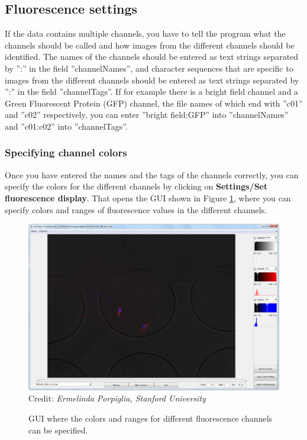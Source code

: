 \documentclass[a4paper, oneside, onecolumn, 11pt]{article}
\newcommand{\menu}[1]{\textbf{#1}}
\newcommand{\setting}[1]{''#1''}
\newcommand{\credit}[1]{\raggedleft \scriptsize Credit:\emph{ #1}}
\begin{document}
\subsection{Fluorescence settings}
\label{sec:settings-fluorescence}
If the data contains multiple channels, you have to tell the program what the channels should be called and how images from the different channels should be identified. The names of the channels should be entered as text strings separated by \setting{:} in the field \setting{channelNames}, and character sequences that are specific to images from the different channels should be entered as text strings separated by \setting{:} in the field \setting{channelTags}. If for example there is a bright field channel and a Green Fluorescent Protein (GFP) channel, the file names of which end with \setting{c01} and \setting{c02} respectively, you can enter \setting{bright field:GFP} into \setting{channelNames} and \setting{c01:c02} into \setting{channelTags}.

\subsubsection{Specifying channel colors}
Once you have entered the names and the tags of the channels correctly, you can specify the colors for the different channels by clicking on \menu{Settings/\allowbreak Set fluorescence display}. That opens the GUI shown in Figure \ref{fig:fluorescence-GUI}, where you can specify colors and ranges of fluorescence values in the different channels.

\begin{figure}[!htb]
\begin{center}
\includegraphics[width = \columnwidth]{figures/fluorescenceGUI}
\credit{Ermelinda Porpiglia, Stanford University}
\caption{GUI where the colors and ranges for different fluorescence channels can be specified.}
\label{fig:fluorescence-GUI}
\end{center}
\end{figure}
\end{document}
